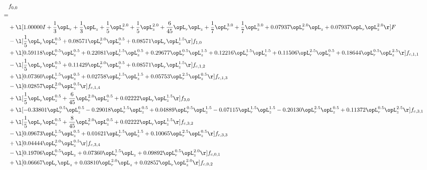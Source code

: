 \begin{alignat}{2} 
\label{eq:f_00_2} 
& f_{0,0} \nonumber \\ 
 = \\ 
& + \l[  1.00000 I + \frac{1}{3} \opL_r + \frac{1}{3} \opL_z + \frac{1}{5} \opL_r^{2.0} + \frac{1}{5} \opL_z^{2.0} + \frac{6}{45} \opL_r \opL_z + \frac{1}{7} \opL_r^{3.0} + \frac{1}{7} \opL_z^{3.0} +  0.07937 \opL_r^{2.0} \opL_z +  0.07937 \opL_r \opL_z^{2.0}  \r] F \nonumber \\ 
& - \l[ \frac{1}{5} \opL_r \opL_z^{0.5} +  0.08571 \opL_r^{2.0} \opL_z^{0.5} +  0.08571 \opL_r \opL_z^{1.5}  \r] f_{1,0} \nonumber \\ 
& + \l[  0.59118 \opL_r^{0.5} \opL_z^{0.5} +  0.22081 \opL_r^{1.5} \opL_z^{0.5} +  0.29677 \opL_r^{0.5} \opL_z^{1.5} +  0.12216 \opL_r^{1.5} \opL_z^{1.5} +  0.11506 \opL_r^{2.5} \opL_z^{0.5} +  0.18644 \opL_r^{0.5} \opL_z^{2.5}  \r] f_{c,1,1} \nonumber \\ 
& - \l[ \frac{1}{5} \opL_r \opL_z^{0.5} +  0.11429 \opL_r^{2.0} \opL_z^{0.5} +  0.08571 \opL_r \opL_z^{1.5}  \r] f_{c,1,2} \nonumber \\ 
& + \l[  0.07360 \opL_r^{1.5} \opL_z^{0.5} +  0.02758 \opL_r^{1.5} \opL_z^{1.5} +  0.05753 \opL_r^{2.5} \opL_z^{0.5}  \r] f_{c,1,3} \nonumber \\ 
& - \l[  0.02857 \opL_r^{2.0} \opL_z^{0.5}  \r] f_{c,1,4} \nonumber \\ 
& + \l[ \frac{1}{5} \opL_r \opL_z^{0.5} + \frac{6}{45} \opL_r^{2.0} \opL_z^{0.5} +  0.02222 \opL_r \opL_z^{1.5}  \r] f_{3,0} \nonumber \\ 
& + \l[  -0.33801 \opL_r^{0.5} \opL_z^{0.5}   -0.29018 \opL_r^{1.5} \opL_z^{0.5} +  0.04889 \opL_r^{0.5} \opL_z^{1.5}   -0.07115 \opL_r^{1.5} \opL_z^{1.5}   -0.20130 \opL_r^{2.5} \opL_z^{0.5} +  0.11372 \opL_r^{0.5} \opL_z^{2.5}  \r] f_{c,3,1} \nonumber \\ 
& + \l[ \frac{1}{5} \opL_r \opL_z^{0.5} + \frac{8}{45} \opL_r^{2.0} \opL_z^{0.5} +  0.02222 \opL_r \opL_z^{1.5}  \r] f_{c,3,2} \nonumber \\ 
& - \l[  0.09673 \opL_r^{1.5} \opL_z^{0.5} +  0.01621 \opL_r^{1.5} \opL_z^{1.5} +  0.10065 \opL_r^{2.5} \opL_z^{0.5}  \r] f_{c,3,3} \nonumber \\ 
& + \l[  0.04444 \opL_r^{2.0} \opL_z^{0.5}  \r] f_{c,3,4} \nonumber \\ 
& - \l[  0.19706 \opL_r^{0.5} \opL_z +  0.07360 \opL_r^{1.5} \opL_z +  0.09892 \opL_r^{0.5} \opL_z^{2.0}  \r] f_{c,0,1} \nonumber \\ 
& + \l[  0.06667 \opL_r \opL_z +  0.03810 \opL_r^{2.0} \opL_z +  0.02857 \opL_r \opL_z^{2.0}  \r] f_{c,0,2} \nonumber \\ 

\end{alignat}
